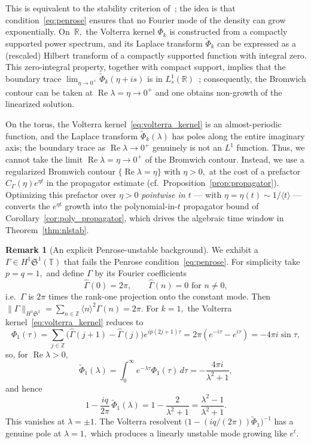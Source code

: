 \documentclass[11pt]{amsart}
\theoremstyle{definition}
\newtheorem{remark}[theorem]{Remark}
\newcommand{\T}{\mathbb{T}}
\newcommand{\Z}{\mathbb{Z}}
\newcommand{\Sp}{\mathfrak{S}}
\begin{document}
This is equivalent to the stability criterion of~\cite{AthanassoulisKyza2024}; the idea is that condition~\eqref{eq:penrose} ensures that no Fourier mode of the density can grow exponentially. On~$\mathbb{R},$ the Volterra kernel $\Phi_k$ is constructed from a compactly supported power spectrum, and its Laplace transform $\tilde\Phi_k$ can be expressed as a (rescaled) Hilbert transform of a compactly supported function with integral zero. This zero-integral property, together with compact support, implies that the boundary trace $\lim_{\eta\to 0^+}\tilde\Phi_k(\eta+is)$ is in $L^1_s(\mathbb{R})$~\cite{AAPS2020}; consequently, the Bromwich contour can be taken at $\operatorname{Re}\lambda=\eta\to 0^+$ and one obtains non-growth of the linearized solution.

On the torus, the Volterra kernel~\eqref{eq:volterra_kernel} is an almost-periodic function,  and the Laplace transform $\tilde\Phi_k(\lambda)$ has poles along the entire imaginary axis;  the boundary trace as $\operatorname{Re}\lambda\to 0^+$ genuinely is not an $L^1$  function. Thus, we cannot take the limit $\operatorname{Re}\lambda=\eta\to 0^+$ of the Bromwich contour.
Instead, we use a regularized Bromwich contour $\{\operatorname{Re}\lambda=\eta\}$ with $\eta>0,$ at the cost of a prefactor $C_\Gamma(\eta)e^{\eta t}$ in the propagator estimate (cf.\ Proposition~\ref{prop:propagator}). Optimizing this prefactor over $\eta>0$ \emph{pointwise in $t$} — with $\eta=\eta(t)\sim 1/\langle t\rangle$ — converts the $e^{\eta t}$ growth into the polynomial-in-$t$ propagator bound of Corollary~\ref{cor:poly_propagator}, which drives the algebraic time window in Theorem~\ref{thm:nlstab}.

\begin{remark}[An explicit Penrose-unstable background]
\label{rem:explicit_unstable}
We exhibit a $\Gamma\in H^1\Sp^1(\T)$ that fails the Penrose condition~\eqref{eq:penrose}. For simplicity take $p=q=1,$ and define $\Gamma$ by its Fourier coefficients
\begin{equation}\label{eq:cntrxpl}
  \hat\Gamma(0)=2\pi,\qquad\hat\Gamma(n)=0\text{ for }n\ne 0,
\end{equation}
i.e.\ $\Gamma$ is $2\pi$ times the rank-one projection onto the constant mode. Then $\|\Gamma\|_{H^1\Sp^1}=\sum_{n\in\Z}\langle n\rangle^2\hat\Gamma(n)=2\pi.$ For $k=1,$ the Volterra kernel~\eqref{eq:volterra_kernel} reduces to
\[
  \Phi_1(\tau)
  =\sum_{j\in\Z}\bigl(\hat\Gamma(j{+}1)-\hat\Gamma(j)\bigr)e^{ip(2j+1)\tau}
  = 2\pi(e^{-i\tau}-e^{i\tau})
  =-4\pi i\sin\tau,
\]
so, for $\operatorname{Re}\lambda>0,$
\[
  \tilde\Phi_1(\lambda)=\int_0^\infty e^{-\lambda\tau}\Phi_1(\tau)\,d\tau=-\frac{4\pi i}{\lambda^2+1},
\]
and hence
\[
  1-\frac{iq}{2\pi}\,\tilde\Phi_1(\lambda)
  =1-\frac{2}{\lambda^2+1}
  =\frac{\lambda^2-1}{\lambda^2+1}.
\]
This vanishes at $\lambda=\pm 1.$ The Volterra resolvent $\bigl(1-(iq/(2\pi))\tilde\Phi_1\bigr)^{-1}$ has a genuine pole at $\lambda=1,$ which produces a linearly unstable mode growing like $e^t.$ %
\end{remark}
\end{document}
